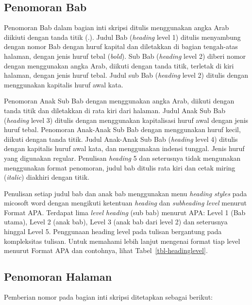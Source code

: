 \documentclass[
  indonesian,
  letterpaper,
]{scrbook}
\begin{document}
\subsection{Penomoran Bab}\label{penomoran-bab}

Penomoran Bab dalam bagian inti skripsi ditulis menggunakan angka Arab
diikiuti dengan tanda titik (.). Judul Bab (\emph{heading} level 1)
ditulis menyambung dengan nomor Bab dengan huruf kapital dan diletakkan
di bagian tengah-atas halaman, dengan jenis huruf tebal (\emph{bold}).
Sub Bab (\emph{heading} level 2) diberi nomor dengan menggunakan angka
Arab, diikuti dengan tanda titik, terletak di kiri halaman, dengan jenis
huruf tebal. Judul sub Bab (\emph{heading} level 2) ditulis dengan
menggunakan kapitalis huruf awal kata.

Penomoran Anak Sub Bab dengan menggunakan angka Arab, diikuti dengan
tanda titik dan diletakkan di rata kiri dari halaman. Judul Anak Sub Bab
(\emph{heading} level 3) ditulis dengan menggunakan kapitalisasi huruf
awal dengan jenis huruf tebal. Penomoran Anak-Anak Sub Bab dengan
menggunakan huruf kecil, diikuti dengan tanda titik. Judul Anak-Anak Sub
Bab (\emph{heading} level 4) ditulis dengan kapitalis huruf awal kata,
dan menggunakan indensi tunggal. Jenis huruf yang digunakan regular.
Penulisan \emph{heading} 5 dan seterusnya tidak mengunakan menggunakan
format penomoran, judul bab ditulis rata kiri dan cetak miring
(\emph{italic}) diakhiri dengan titik.

Penulisan setiap judul bab dan anak bab menggunakan menu \emph{heading
styles} pada micosoft word dengan mengikuti ketentuan \emph{heading} dan
\emph{subheading} \emph{level} menurut Format APA. Terdapat lima
\emph{level heading} (sub bab) menurut APA: Level 1 (Bab utama), Level 2
(anak bab), Level 3 (anak bab dari level 2) dan seterusnya hinggal Level
5. Penggunaan heading level pada tulisan bergantung pada kompleksitas
tulisan. Untuk memahami lebih lanjut mengenai format tiap level menurut
Format APA dan contohnya, lihat Tabel~\ref{tbl-headinglevel}.

\subsection{Penomoran Halaman}\label{penomoran-halaman-1}

Pemberian nomor pada bagian inti skripsi ditetapkan sebagai berikut:
\end{document}
